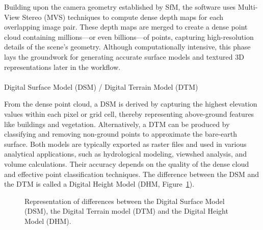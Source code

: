 \documentclass[
  letterpaper,
  11pt,
  english,
  singlespacing,
  headsepline]{MastersDoctoralThesis}
\makeatletter
\let\oldparagraph\paragraph
\renewcommand{\paragraph}{
    \@ifstar
      \xxxParagraphStar
      \xxxParagraphNoStar
  }
\newcommand{\xxxParagraphStar}[1]{\oldparagraph*{#1}\mbox{}}
\newcommand{\xxxParagraphNoStar}[1]{\oldparagraph{#1}\mbox{}}
\makeatother
\begin{document}
\begin{spacing}{1.5}
Building upon the camera geometry established by SfM, the software uses
Multi-View Stereo (MVS) techniques to compute dense depth maps for each
overlapping image pair. These depth maps are merged to create a dense
point cloud containing millions---or even billions---of points,
capturing high-resolution details of the scene's geometry. Although
computationally intensive, this phase lays the groundwork for generating
accurate surface models and textured 3D representations later in the
workflow.

\paragraph{Digital Surface Model (DSM) / Digital Terrain Model
(DTM)}\label{digital-surface-model-dsm-digital-terrain-model-dtm}

From the dense point cloud, a DSM is derived by capturing the highest
elevation values within each pixel or grid cell, thereby representing
above-ground features like buildings and vegetation. Alternatively, a
DTM can be produced by classifying and removing non-ground points to
approximate the bare-earth surface. Both models are typically exported
as raster files and used in various analytical applications, such as
hydrological modeling, viewshed analysis, and volume calculations. Their
accuracy depends on the quality of the dense cloud and effective point
classification techniques. The difference between the DSM and the DTM is
called a Digital Height Model (DHM, Figure~\ref{fig-DSMDTM}).

\begin{figure}


\caption{\label{fig-DSMDTM}Representation of differences between the
Digital Surface Model (DSM), the Digital Terrain model (DTM) and the
Digital Height Model (DHM).}


\end{figure}
\end{spacing}
\end{document}

